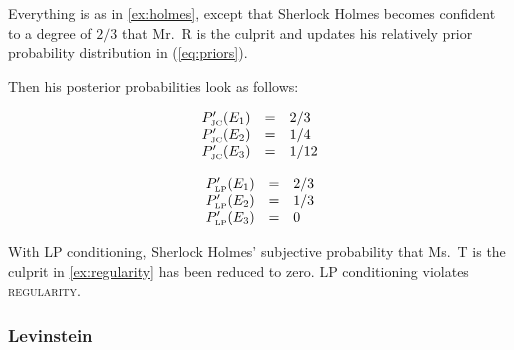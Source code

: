 \documentclass[12pt]{article}
\begin{document}

\begin{example}
  \label{ex:regularity}
  Everything is as in {\xample} \ref{ex:holmes}, except that Sherlock
  Holmes becomes confident to a degree of $2/3$ that Mr.\ R is the
  culprit and updates his relatively prior probability distribution in
  (\ref{eq:priors}).
\end{example}

Then his posterior probabilities look as follows:

\begin{equation}
  \label{eq:sherlockposteriorjcreg}
  \begin{array}{rcl}
  P'_{\mbox{\tiny JC}}(E_{1})&=&2/3\\
  P'_{\mbox{\tiny JC}}(E_{2})&=&1/4\\
  P'_{\mbox{\tiny JC}}(E_{3})&=&1/12
\end{array}
\end{equation}

\begin{equation}
  \label{eq:sherlockposteriorlpreg}
  \begin{array}{rcl}
  P'_{\mbox{\tiny LP}}(E_{1})&=&2/3\\
  P'_{\mbox{\tiny LP}}(E_{2})&=&1/3\\
  P'_{\mbox{\tiny LP}}(E_{3})&=&0
\end{array}
\end{equation}

With LP conditioning, Sherlock Holmes' subjective probability that
Ms.\ T is the culprit in {\xample} \ref{ex:regularity} has been reduced
to zero. 
LP conditioning violates \textsc{regularity}.

\subsubsection{Levinstein}
\label{Levinstein}
\end{document}
